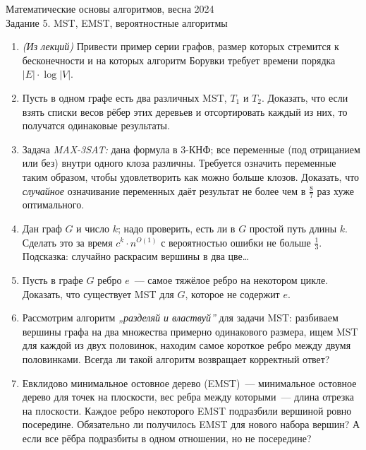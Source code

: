 \documentclass[a4paper,11pt]{article}
\begin{document}
\begin{center}
	\Large Математические основы алгоритмов, весна 2024 \\
	\Large Задание 5. MST, EMST, вероятностные алгоритмы
\end{center}

\begin{enumerate}

	\item {\it (Из лекций)} Привести пример серии графов, размер которых стремится к бесконечности и на которых алгоритм Борувки требует времени порядка \(|E| \cdot \log |V|\).

	\item Пусть в одном графе есть два различных MST, \(T_1\) и \(T_2\). Доказать, что если взять списки весов рёбер этих деревьев и отсортировать каждый из них, то получатся одинаковые результаты.

	\item Задача {\it MAX-3SAT:} дана формула в 3-КНФ; все переменные (под отрицанием или без) внутри одного клоза различны. Требуется означить переменные таким образом, чтобы удовлетворить как можно больше клозов. Доказать, что {\it случайное} означивание переменных даёт результат не более чем в \(\frac87\) раз хуже оптимального.

	\item Дан граф \(G\) и число \(k\); надо проверить, есть ли в \(G\) простой путь длины \(k\). Сделать это за время \(c^k \cdot n^{O(1)}\) с вероятностью ошибки не больше \(\tfrac{1}{3}\). Подсказка: случайно раскрасим вершины в два цве\ldots

	\item Пусть в графе \(G\) ребро \(e\)~— самое тяжёлое ребро на некотором цикле. Доказать, что существует MST для \(G\), которое не содержит \(e\).

	\item Рассмотрим алгоритм {\it „разделяй и властвуй”} для задачи MST: разбиваем вершины графа на два множества примерно одинакового размера, ищем MST для каждой из двух половинок, находим самое короткое ребро между двумя половинками. Всегда ли такой алгоритм возвращает корректный ответ?

	\item Евклидово минимальное остовное дерево (EMST)~— минимальное остовное дерево для точек на плоскости, вес ребра между которыми~— длина отрезка на плоскости. Каждое ребро некоторого EMST подразбили вершиной ровно посередине. Обязательно ли получилось EMST для нового набора вершин? А если все рёбра подразбиты в одном отношении, но не посередине?


\end{enumerate}
\end{document}
